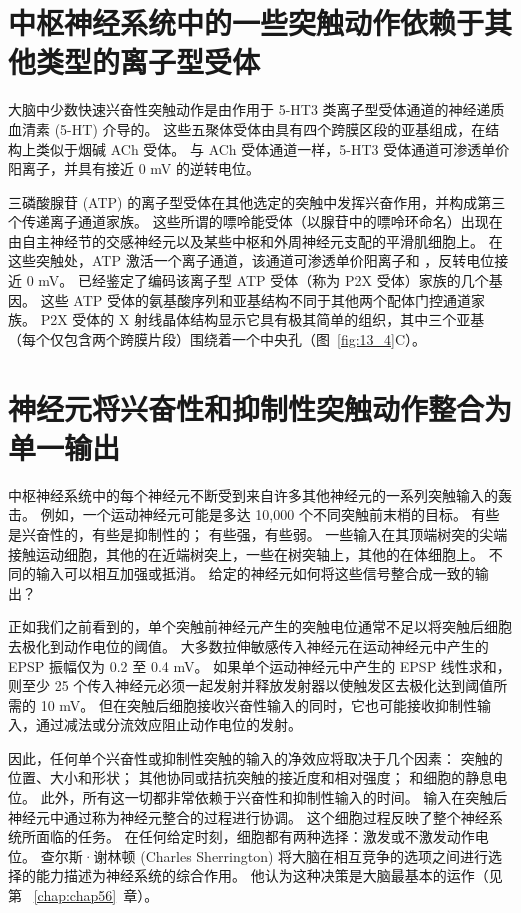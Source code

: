 \section{中枢神经系统中的一些突触动作依赖于其他类型的离子型受体}

大脑中少数快速兴奋性突触动作是由作用于 5-HT3 类离子型受体通道的神经递质血清素 (5-HT) 介导的。
这些五聚体受体由具有四个跨膜区段的亚基组成，在结构上类似于烟碱 ACh 受体。
与 ACh 受体通道一样，5-HT3 受体通道可渗透单价阳离子，并具有接近 0 mV 的逆转电位。


三磷酸腺苷 (ATP) 的离子型受体在其他选定的突触中发挥兴奋作用，并构成第三个传递离子通道家族。
这些所谓的嘌呤能受体（以腺苷中的嘌呤环命名）出现在由自主神经节的交感神经元以及某些中枢和外周神经元支配的平滑肌细胞上。
在这些突触处，ATP 激活一个离子通道，该通道可渗透单价阳离子和 ，反转电位接近 0 mV。
已经鉴定了编码该离子型 ATP 受体（称为 P2X 受体）家族的几个基因。
这些 ATP 受体的氨基酸序列和亚基结构不同于其他两个配体门控通道家族。
P2X 受体的 X 射线晶体结构显示它具有极其简单的组织，其中三个亚基（每个仅包含两个跨膜片段）围绕着一个中央孔（图~\ref{fig:13_4}C）。



\section{神经元将兴奋性和抑制性突触动作整合为单一输出}

中枢神经系统中的每个神经元不断受到来自许多其他神经元的一系列突触输入的轰击。
例如，一个运动神经元可能是多达 10,000 个不同突触前末梢的目标。
有些是兴奋性的，有些是抑制性的；
有些强，有些弱。
一些输入在其顶端树突的尖端接触运动细胞，其他的在近端树突上，一些在树突轴上，其他的在体细胞上。
不同的输入可以相互加强或抵消。
给定的神经元如何将这些信号整合成一致的输出？


正如我们之前看到的，单个突触前神经元产生的突触电位通常不足以将突触后细胞去极化到动作电位的阈值。
大多数拉伸敏感传入神经元在运动神经元中产生的 EPSP 振幅仅为 0.2 至 0.4 mV。
如果单个运动神经元中产生的 EPSP 线性求和，则至少 25 个传入神经元必须一起发射并释放发射器以使触发区去极化达到阈值所需的 10 mV。
但在突触后细胞接收兴奋性输入的同时，它也可能接收抑制性输入，通过减法或分流效应阻止动作电位的发射。


因此，任何单个兴奋性或抑制性突触的输入的净效应将取决于几个因素：
突触的位置、大小和形状；
其他协同或拮抗突触的接近度和相对强度；
和细胞的静息电位。 
此外，所有这一切都非常依赖于兴奋性和抑制性输入的时间。
输入在突触后神经元中通过称为神经元整合的过程进行协调。
这个细胞过程反映了整个神经系统所面临的任务。
在任何给定时刻，细胞都有两种选择：激发或不激发动作电位。
查尔斯·谢林顿 (Charles Sherrington) 将大脑在相互竞争的选项之间进行选择的能力描述为神经系统的综合作用。
他认为这种决策是大脑最基本的运作（见第 ~\ref{chap:chap56}~章）。



